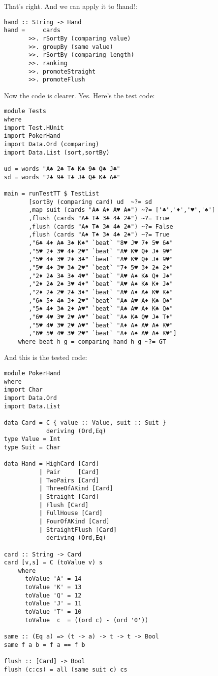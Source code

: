 \lhN That's right.
\lhA \success And we can apply it to \il!hand!:
\begin{lstlisting}[frame=single]
hand :: String -> Hand
hand =     cards
       >>. rSortBy (comparing value)
       >>. groupBy (same value)
       >>. rSortBy (comparing length)
       >>. ranking 
       >>. promoteStraight
       >>. promoteFlush    
\end{lstlisting}
\success Now the code is clearer.
\lhN Yes. Here's the test code:
\begin{lstlisting}[frame=single]
module Tests
where 
import Test.HUnit
import PokerHand
import Data.Ord (comparing)
import Data.List (sort,sortBy)

ud = words "A♣ 2♣ T♣ K♣ 9♣ Q♣ J♣"
sd = words "2♣ 9♣ T♣ J♣ Q♣ K♣ A♣"

main = runTestTT $ TestList 
       [sortBy (comparing card) ud  ~?= sd
       ,map suit (cards "A♣ A♦ A♥ A♠") ~?= ['♣','♦','♥','♠']
       ,flush (cards "A♣ T♣ 3♣ 4♣ 2♣") ~?= True
       ,flush (cards "A♠ T♣ 3♣ 4♣ 2♣") ~?= False
       ,flush (cards "A♠ T♠ 3♠ 4♠ 2♠") ~?= True
       ,"6♣ 4♦ A♣ 3♠ K♠" `beat` "8♥ J♥ 7♦ 5♥ 6♣"
       ,"5♥ 2♦ 3♥ 4♦ 2♥" `beat` "A♥ K♥ Q♦ J♦ 9♥"
       ,"5♥ 4♦ 3♥ 2♦ 3♣" `beat` "A♥ K♥ Q♦ J♦ 9♥"
       ,"5♥ 4♦ 3♥ 3♣ 2♥" `beat` "7♦ 5♥ 3♦ 2♠ 2♦"
       ,"2♦ 2♣ 3♣ 3♠ 4♥" `beat` "A♥ A♠ K♣ Q♦ J♠"  
       ,"2♦ 2♣ 2♠ 3♥ 4♦" `beat` "A♥ A♠ K♣ K♦ J♠"
       ,"2♦ 2♠ 2♥ 2♣ 3♦" `beat` "A♥ A♦ A♠ K♥ K♠"
       ,"6♠ 5♦ 4♣ 3♦ 2♥" `beat` "A♣ A♥ A♦ K♣ Q♠"
       ,"5♠ 4♦ 3♣ 2♦ A♥" `beat` "A♣ A♥ A♦ K♣ Q♠"
       ,"6♥ 4♥ 3♥ 2♥ A♥" `beat` "A♠ K♣ Q♥ J♠ T♦"
       ,"5♥ 4♥ 3♥ 2♥ A♥" `beat` "A♦ A♠ A♥ A♠ K♥"
       ,"6♥ 5♥ 4♥ 3♥ 2♥" `beat` "A♦ A♠ A♥ A♠ K♥"]
    where beat h g = comparing hand h g ~?= GT
\end{lstlisting} %
\hspace*{\fill}
\lhA And this is the tested code:
\begin{lstlisting}[frame=single]
module PokerHand
where
import Char
import Data.Ord
import Data.List

data Card = C { value :: Value, suit :: Suit } 
            deriving (Ord,Eq)
type Value = Int
type Suit = Char

data Hand = HighCard [Card]
          | Pair     [Card]
          | TwoPairs [Card]
          | ThreeOfAKind [Card]
          | Straight [Card]
          | Flush [Card]
          | FullHouse [Card]
          | FourOfAKind [Card]
          | StraightFlush [Card]
            deriving (Ord,Eq)

card :: String -> Card
card [v,s] = C (toValue v) s
    where 
      toValue 'A' = 14
      toValue 'K' = 13
      toValue 'Q' = 12
      toValue 'J' = 11
      toValue 'T' = 10
      toValue  c  = ((ord c) - (ord '0'))

same :: (Eq a) => (t -> a) -> t -> t -> Bool
same f a b = f a == f b

flush :: [Card] -> Bool
flush (c:cs) = all (same suit c) cs
\end{lstlisting}
